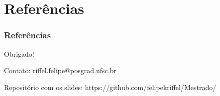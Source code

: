 \documentclass{beamer}
\theoremstyle{definition}
\begin{document}
\section{Referências}
\begin{frame}
\tableofcontents[currentsection]
\end{frame}

\begin{frame}
\frametitle{Referências}
\vspace{-2em}
\scriptsize

    
\end{frame}

\begin{frame}

\begin{center}
\Large Obrigado!
\end{center}

\vspace{1em}
Contato: riffel.felipe@posgrad.ufsc.br 

\vspace{1em}

Repositório com os slides: https://github.com/felipekriffel/Mestrado/
    
\end{frame}
\end{document}

